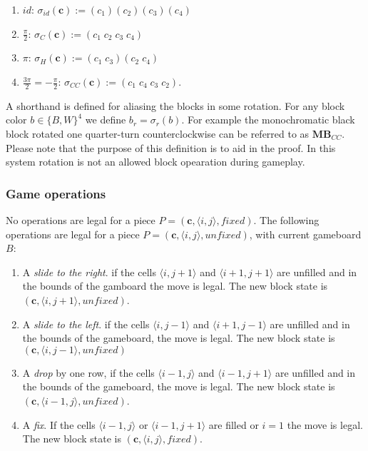 \begin{description}[style=unboxed, leftmargin=0cm,labelsep=1em]
    \begin{enumerate}
        \item $id$: $\sigma_{id}(\mathbf{c}) := (c_1)(c_2)(c_3)(c_4)$
        \item $\frac{\pi}{2}$: $\sigma_{C}(\mathbf{c}) := (c_1\;c_2\;c_3\;c_4)$
        \item $\pi$: $\sigma_{H}(\mathbf{c}) := (c_1\;c_3)(c_2\;c_4)$
        \item $\frac{3 \pi}{2} = -\frac{\pi}{2}$: $\sigma_{CC}(\mathbf{c}) := (c_1\;c_4\;c_3\;c_2)$.
    \end{enumerate}

    A shorthand is defined for aliasing the blocks in some rotation. For any block color $b \in \{B, W\}^4$ we define $b_{r} = \sigma_{r}(b)$. For example the monochromatic black block rotated one quarter-turn counterclockwise can be referred to as $\mathbf{MB}_{CC}$. Please note that the purpose of this definition is to aid in the proof. In this system rotation is not an allowed block opearation during gameplay.
\end{description}
\subsubsection{Game operations}
\label{subsub:operations}

No operations are legal for a piece $P = (\mathbf{c}, \langle i,j \rangle, fixed)$. The following operations are legal for a piece $P = (\mathbf{c}, \langle i,j \rangle, unfixed)$, with current gameboard $B$:

    \begin{enumerate}
        \item A \emph{slide to the right}. if the cells $\langle i,j+1 \rangle$ and $\langle i+1, j+1 \rangle$ are unfilled and in the bounds of the gamboard the move is legal. The new block state is $(\mathbf{c}, \langle i, j+1 \rangle, unfixed)$.
    \item A \emph{slide to the left}. if the cells $\langle i,j-1 \rangle$ and $\langle i+1, j-1 \rangle$ are unfilled and in the bounds of the gameboard, the move is legal. The new block state is $(\mathbf{c}, \langle i, j-1 \rangle, unfixed)$
\item A \emph{drop} by one row, if the cells $\langle i-1, j \rangle$ and $\langle i-1, j+1 \rangle$ are unfilled and in the bounds of the gameboard, the move is legal. The new block state is $(\mathbf{c}, \langle i-1, j \rangle, unfixed)$.
        \item A \emph{fix}. If the cells $\langle i-1, j \rangle$ or $\langle i-1, j+1 \rangle$ are filled or $i=1$ the move is legal. The new block state is $(\mathbf{c}, \langle i, j \rangle, fixed)$.
    \end{enumerate}

